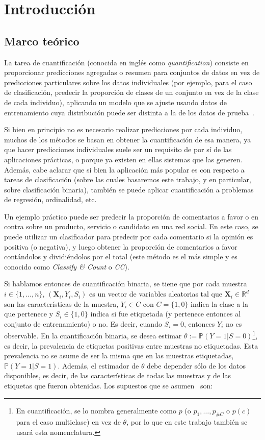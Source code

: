 \chapter{Introducción}\label{introduccion}

\section{Marco teórico}\label{introduccion:marco_teorico}

La tarea de cuantificación (conocida en inglés como {\it quantification\/})
consiste en proporcionar predicciones agregadas o resumen para conjuntos de
datos en vez de predicciones particulares sobre los datos individuales (por
ejemplo, para el caso de clasificación, predecir la proporción de clases de un
conjunto en vez de la clase de cada individuo), aplicando un modelo que se
ajuste usando datos de entrenamiento cuya distribución puede ser distinta a la
de los datos de prueba~\cite{forman2005counting}.

Si bien en principio no es necesario realizar predicciones por cada individuo,
muchos de los métodos se basan en obtener la cuantificación de esa manera, ya
que hacer predicciones individuales suele ser un requisito de por sí de las
aplicaciones prácticas, o porque ya existen en ellas sistemas que las generen.
Además, cabe aclarar que si bien la aplicación más popular es con respecto a
tareas de clasificación (sobre las cuales basaremos este trabajo, y en
particular, sobre clasificación binaria), también se puede aplicar
cuantificación a problemas de regresión, ordinalidad, etc.

Un ejemplo práctico puede ser predecir la proporción de comentarios a favor o en
contra sobre un producto, servicio o candidato en una red social. En este caso,
se puede utilizar un clasificador para predecir por cada comentario si la
opinión es positiva (o negativa), y luego obtener la proporción de comentarios a
favor contándolos y dividiéndolos por el total (este método es el más simple y
es conocido como {\it Classify \& Count\/} o {\it CC\/}).

Si hablamos entonces de cuantificación binaria, se tiene que por cada muestra $i
\in \{1,\dots,n\}$, $(\boldsymbol{X}_i,Y_i,S_i)$ es un vector de variables
aleatorias tal que $\boldsymbol{X}_i \in \mathbb{R}^d$ son las características
de la muestra, $Y_i \in C$ con $C=\{1,0\}$ indica la clase a la que pertenece y
$S_i \in \{1,0\}$ indica si fue etiquetada (y pertenece entonces al conjunto de
entrenamiento) o no. Es decir, cuando $S_i=0$, entonces $Y_i$ no es observable.
En la cuantificación binaria, se desea estimar $\theta:=
\mathbb{P}(Y=1|S=0)$\footnote{En cuantificación, se lo nombra generalmente como
$p$ (o $p_1,\dots,p_{\#C}$ o $p(c)$ para el caso multiclase) en vez de $\theta$,
por lo que en este trabajo también se usará esta nomenclatura.}, es decir, la
prevalencia de etiquetas positivas entre muestras no etiquetadas. Esta
prevalencia no se asume de ser la misma que en las muestras etiquetadas,
$\mathbb{P}(Y=1|S=1)$. Además, el estimador de $\theta$ debe depender sólo de
los datos disponibles, es decir, de las características de todas las muestras y
de las etiquetas que fueron obtenidas. Los supuestos que se
asumen~\cite{vaz2019quantification} son:

